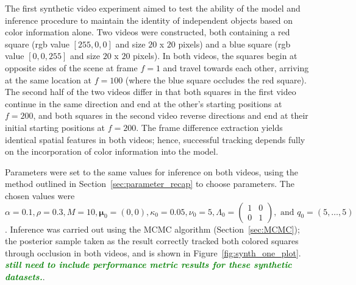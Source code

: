 \documentclass[smallcondensed, final]{svjour3}
\newcommand{\willie}[1]{\textcolor{green}{\textsf{\emph{\textbf{\textcolor{green}{#1}}}}}}
\begin{document}
The first synthetic video experiment aimed to test the ability of the model and inference procedure to maintain the identity of independent objects based on color information alone. Two videos were constructed, both containing a red square (rgb value $[255,0,0]$ and size $20$ x $20$ pixels) and a blue square (rgb value $[0,0,255]$ and size $20$ x $20$ pixels). In both videos, the squares begin at opposite sides of the scene at frame $f=1$ and travel towards each other, arriving at the same location at $f=100$ (where the blue square occludes the red square). The second half of the two videos differ in that both squares in the first video continue in the same direction and end at the other's starting positions at $f=200$, and both squares in the second video reverse directions and end at their initial starting positions at $f=200$. The frame difference extraction yields identical spatial features in both videos; hence, successful tracking depends fully on the incorporation of color information into the model.

Parameters were set to the same values for inference on both videos, using the method outlined in Section~\ref{sec:parameter_recap} to choose parameters. The chosen values were $\alpha = 0.1, \rho = 0.3, M = 10, \boldsymbol{\mu}_{0} = (0,0), \kappa_{0} = 0.05, \nu_{0} = 5, \Lambda_{0} = \left( \begin{smallmatrix} 1&0\\ 0&1 \end{smallmatrix} \right), \text{ and } q_{0} = (5, \ldots, 5)$. Inference was carried out using the MCMC algorithm (Section~\ref{sec:MCMC}); the posterior sample taken as the result correctly tracked both colored squares through occlusion in both videos, and is shown in Figure~\ref{fig:synth_one_plot}. \willie{still need to include performance metric results for these synthetic datasets.}.
\end{document}
